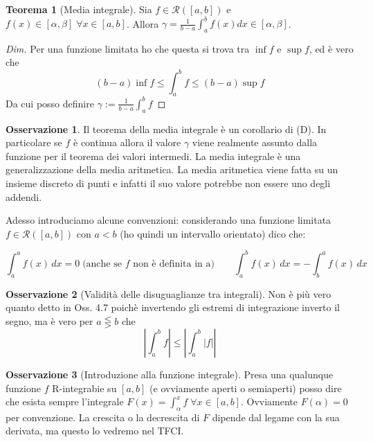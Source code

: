 \documentclass{article}
\theoremstyle{definition}
\newtheorem{theorem}{Teorema}[section]
\theoremstyle{definition}
\theoremstyle{definition}
\theoremstyle{definition}
\newtheorem{remark}{Osservazione}[section]
\theoremstyle{definition}
\theoremstyle{definition}
\begin{document}
\begin{theorem}[Media integrale]
    Sia $f\in\mathcal{R}([a,b])$ e $f(x)\in[\alpha,\beta] \; \forall x\in[a,b]$. Allora $\gamma=\frac{1}{b-a}\int_a^bf(x)dx\in[\alpha,\beta]$.
    \begin{proof}[Dim]
        Per una funzione limitata ho che questa si trova tra $\inf f$ e $\sup f$, ed è vero che 
        \[
            (b-a)\inf f \leq \int_a^b f\leq (b-a)\sup f 
        \]
        Da cui posso definire $\gamma := \frac{1}{b-a}\int_a^b f$
    \end{proof}
\end{theorem}

\begin{remark}
    Il teorema della media integrale è un corollario di (D). In particolare se $f$ è continua allora il valore $\gamma$ viene realmente assunto dalla funzione per il teorema dei valori intermedi. La media integrale è una generalizzazione della media aritmetica. La media aritmetica viene fatta su un insieme discreto di punti e infatti il suo valore potrebbe non essere uno degli addendi.
\end{remark}

\vspace{3mm}

Adesso introduciamo alcune convenzioni: considerando una funzione limitata $f\in\mathcal{R}([a,b])$ con $a<b$ (ho quindi un intervallo orientato) dico che:

\[
    \int_a^a f(x) \, dx = 0 \; \text{(anche se $f$ non è definita in a)} \qquad \int_a^b f(x) \, dx = -\int_b^a f(x)\, dx    
\]

\begin{remark}[Validità delle disuguaglianze tra integrali]
    Non è più vero quanto detto in Oss. 4.7 poichè invertendo gli estremi di integrazione inverto il segno, ma è vero per $a \lesseqgtr b$ che 
    \[
        \left|\int_a^b f \right| \leq \left|\int_a^b \left| f \right| \right|
    \]
\end{remark}

\begin{remark}[Introduzione alla funzione integrale]
    Presa una qualunque funzione $f$ R-integrabie su $[a,b]$ (e ovviamente aperti o semiaperti) posso dire che esista sempre l'integrale $\displaystyle{F(x)=\int_\alpha^x f} \; \forall x \in [a,b]$. Ovviamente $F(\alpha)=0$ per convenzione. La crescita o la decrescita di $F$ dipende dal legame con la sua derivata, ma questo lo vedremo nel TFCI.
\end{remark}
\end{document}
